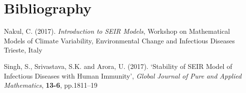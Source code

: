 \documentclass[a4paper, 12pt, notitlepage]{report}
\begin{document}
%
%
%
%
%
\chapter*{Bibliography}
%
\begin{description}
\item Nakul, C. (2017). \emph{Introduction to SEIR Models}, Workshop on Mathematical Models of Climate Variability, Environmental Change and Infectious Diseases Trieste, Italy

\item Singh, S., Srivastava, S.K. and Arora, U. (2017). `Stability of SEIR Model of Infectious Diseases
with Human Immunity', \emph{Global Journal of Pure and Applied Mathematics}, \textbf{13-6}, pp.1811--19





\end{description}
\end{document}
